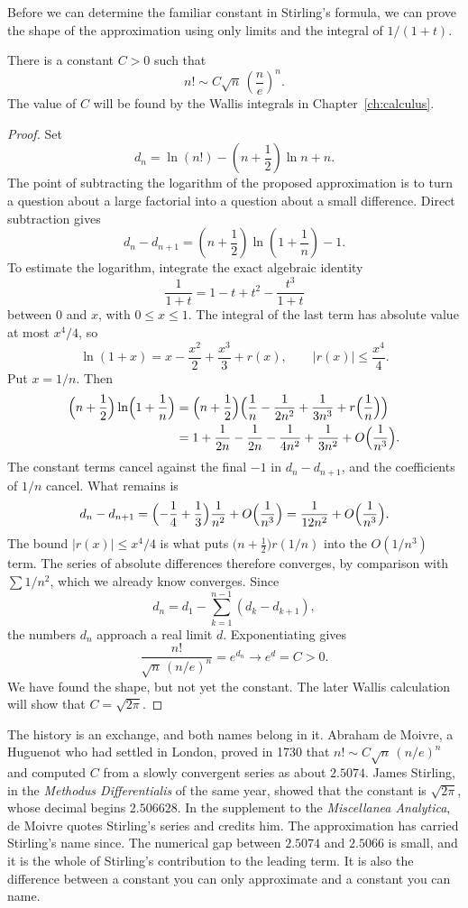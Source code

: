 Before we can determine the familiar constant in Stirling's formula, we can prove the shape of the approximation using only limits and the integral of $1/(1+t)$.

\begin{proposition}\label{prop:stirlingshape}
There is a constant $C>0$ such that
\[
n!\sim C\sqrt n\,\left(\frac ne\right)^n.
\]
The value of $C$ will be found by the Wallis integrals in Chapter~\ref{ch:calculus}.
\end{proposition}
\begin{proof}
Set
\[
d_n=\ln(n!)-\left(n+\frac12\right)\ln n+n.
\]
The point of subtracting the logarithm of the proposed approximation is to turn a question about a large factorial into a question about a small difference. Direct subtraction gives
\[
d_n-d_{n+1}=\left(n+\frac12\right)\ln\left(1+\frac1n\right)-1.
\]
To estimate the logarithm, integrate the exact algebraic identity
\[
\frac1{1+t}=1-t+t^2-\frac{t^3}{1+t}
\]
between $0$ and $x$, with $0\le x\le1$. The integral of the last term has absolute value at most $x^4/4$, so
\[
\ln(1+x)=x-\frac{x^2}{2}+\frac{x^3}{3}+r(x),
\qquad |r(x)|\le\frac{x^4}{4}.
\]
Put $x=1/n$. Then
\begin{align*}
\Bigl(n+\frac12\Bigr)\ln\Bigl(1+\frac1n\Bigr)
&=\Bigl(n+\frac12\Bigr)\Bigl(\frac1n-\frac1{2n^2}+\frac1{3n^3}+r\Bigl(\frac1n\Bigr)\Bigr)\\
&=1+\frac1{2n}-\frac1{2n}-\frac1{4n^2}+\frac1{3n^2}+O\Bigl(\frac1{n^3}\Bigr).
\end{align*}
The constant terms cancel against the final $-1$ in $d_n-d_{n+1}$, and the coefficients of $1/n$ cancel. What remains is
\[
d_n-d_{n+1}=\Bigl(-\frac1{4}+\frac1{3}\Bigr)\frac1{n^2}+O\Bigl(\frac1{n^3}\Bigr)=\frac1{12n^2}+O\Bigl(\frac1{n^3}\Bigr).
\]
The bound $|r(x)|\le x^4/4$ is what puts $\bigl(n+\frac12\bigr)r(1/n)$ into the $O(1/n^3)$ term.
The series of absolute differences therefore converges, by comparison with $\sum 1/n^2$, which we already know converges. Since
\[
d_n=d_1-\sum_{k=1}^{n-1}(d_k-d_{k+1}),
\]
the numbers $d_n$ approach a real limit $d$. Exponentiating gives
\[
\frac{n!}{\sqrt n\,(n/e)^n}=e^{d_n}\longrightarrow e^d=C>0.
\]
We have found the shape, but not yet the constant. The later Wallis calculation will show that $C=\sqrt{2\pi}$.
\end{proof}

The history is an exchange, and both names belong in it. Abraham de Moivre, a Huguenot who had settled in London, proved in 1730 that $n!\sim C\sqrt n\,(n/e)^n$ and computed $C$ from a slowly convergent series as about $2.5074$. James Stirling, in the \emph{Methodus Differentialis} of the same year, showed that the constant is $\sqrt{2\pi}$, whose decimal begins $2.506628$. In the supplement to the \emph{Miscellanea Analytica}, de Moivre quotes Stirling's series and credits him. The approximation has carried Stirling's name since. The numerical gap between $2.5074$ and $2.5066$ is small, and it is the whole of Stirling's contribution to the leading term. It is also the difference between a constant you can only approximate and a constant you can name.

